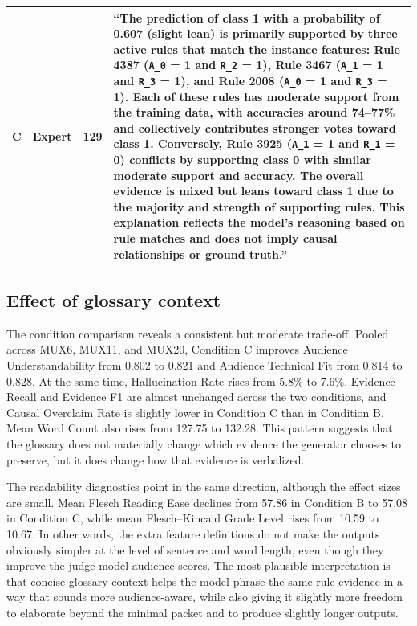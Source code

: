 \documentclass[sigconf,nonacm]{acmart}
\begin{document}
\begin{table}[t]
\begin{tabular}{p{1.6cm}p{1.4cm}r p{11.0cm}}
C & Expert & 129 & ``The prediction of \textbf{class 1} with a probability of \textbf{0.607} (\textbf{slight lean}) is primarily supported by three active rules that match the instance features: \textbf{Rule 4387} (\texttt{\textbf{A\_0}} = 1 and \texttt{\textbf{R\_2}} = 1), \textbf{Rule 3467} (\texttt{\textbf{A\_1}} = 1 and \texttt{\textbf{R\_3}} = 1), and \textbf{Rule 2008} (\texttt{\textbf{A\_0}} = 1 and \texttt{\textbf{R\_3}} = 1). Each of these rules has moderate support from the training data, with accuracies around \textbf{74--77\%} and collectively contributes stronger votes toward \textbf{class 1}. Conversely, \textbf{Rule 3925} (\texttt{\textbf{A\_1}} = 1 and \texttt{\textbf{R\_1}} = 0) conflicts by supporting \textbf{class 0} with similar moderate support and accuracy. The overall evidence is mixed but leans toward \textbf{class 1} due to the majority and strength of supporting rules. This explanation reflects the model's reasoning based on rule matches and does not imply causal relationships or ground truth.'' \\
\bottomrule
\end{tabular}
\end{table}

\subsection{Effect of glossary context}
The condition comparison reveals a consistent but moderate trade-off. Pooled across MUX6, MUX11, and MUX20, Condition C improves Audience Understandability from 0.802 to 0.821 and Audience Technical Fit from 0.814 to 0.828. At the same time, Hallucination Rate rises from 5.8\% to 7.6\%. Evidence Recall and Evidence F1 are almost unchanged across the two conditions, and Causal Overclaim Rate is slightly lower in Condition C than in Condition B. Mean Word Count also rises from 127.75 to 132.28. This pattern suggests that the glossary does not materially change which evidence the generator chooses to preserve, but it does change how that evidence is verbalized.

The readability diagnostics point in the same direction, although the effect sizes are small. Mean Flesch Reading Ease declines from 57.86 in Condition B to 57.08 in Condition C, while mean Flesch--Kincaid Grade Level rises from 10.59 to 10.67. In other words, the extra feature definitions do not make the outputs obviously simpler at the level of sentence and word length, even though they improve the judge-model audience scores. The most plausible interpretation is that concise glossary context helps the model phrase the same rule evidence in a way that sounds more audience-aware, while also giving it slightly more freedom to elaborate beyond the minimal packet and to produce slightly longer outputs.
\end{document}
